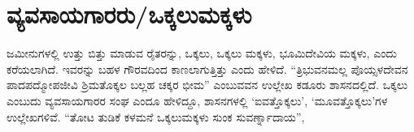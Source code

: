 \section{ವ್ಯವಸಾಯಗಾರರು/ಒಕ್ಕಲುಮಕ್ಕಳು}

ಜಮೀನುಗಳಲ್ಲಿ ಉತ್ತು ಬಿತ್ತು ಮಾಡುವ ರೈತರನ್ನು, ಒಕ್ಕಲು, ಒಕ್ಕಲು ಮಕ್ಕಳು, ಭೂಮಿದೇವಿಯ ಮಕ್ಕಳು, ಎಂದು ಕರೆಯಲಾಗಿದೆ. ಇವರನ್ನು ಬಹಳ ಗೌರವದಿಂದ ಕಾಣಲಾಗುತ್ತಿತ್ತು ಎಂದು ಹೇಳಿದೆ. “ತ್ರಿಭುವನಮಲ್ಲ ಪೊಯ್ಸಳದೇವನ ಪಾದಪದ್ಮೋಪಜೀವಿ ಶ್ರಿಮತೊಕ್ಕಲ ಬಲ್ಲಹ ಚಕ್ಕರ ಭೀಮ” ಎಂಬುವವನ ಉಲ್ಲೇಖ ಕಡೂರು ಶಾಸನದಲ್ಲಿದೆ. ಒಕ್ಕಲು ಎಂಬುದು ವ್ಯವಸಾಯಗಾರರ ಸಂಘ ಎಂದೂ ಹೇಳಿದ್ದೂ, ಶಾಸನಗಳಲ್ಲಿ ‘ಐವತ್ತೊಕ್ಕಲು’, ‘ಮೂವತ್ತೊಕ್ಕಲು’ಗಳ ಉಲ್ಲೇಖಗಳಿವೆ. “ತೋಟ ತುಡಿಕೆ ಕಳಮನೆ ಒಕ್ಕಲುಮಕ್ಕಳು ಸುಂಕ ಸುವರ್ಣ್ನಾದಾಯ”,
